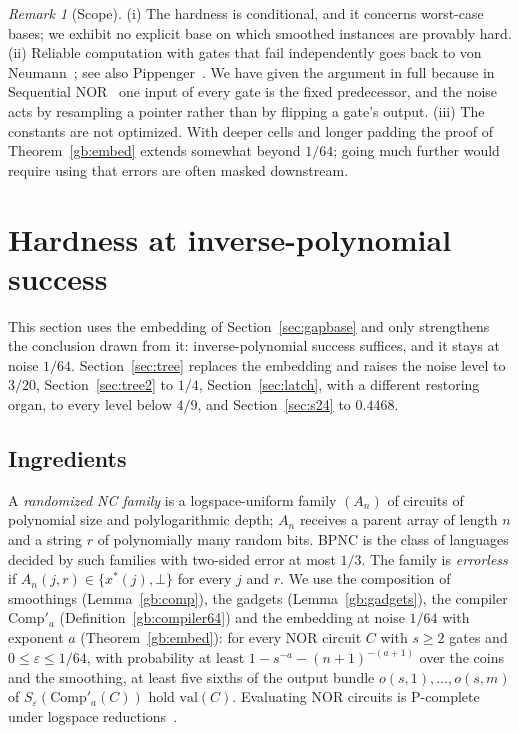 \documentclass[11pt]{amsart}
\theoremstyle{definition}
\theoremstyle{remark}
\newtheorem{remark}[theorem]{Remark}
\newcommand{\eps}{\varepsilon}
\newcommand{\val}{\mathrm{val}}
\newcommand{\Comp}{\mathrm{Comp}}
\begin{document}
\begin{remark}[Scope]\label{gb:rem-scope}
(i) The hardness is conditional, and it concerns worst-case bases; we
exhibit no explicit base on which smoothed instances are provably hard.
(ii) Reliable computation with gates that fail independently goes back to
von Neumann~\cite{gb-vonneumann}; see also Pippenger~\cite{gb-pippenger}.
We have given the argument in full because in Sequential
NOR~\cite{okhotin} one input of every gate is the fixed predecessor, and the
noise acts by resampling a pointer rather than by flipping a gate's output.
(iii) The constants are not optimized. With deeper cells and longer padding
the proof of Theorem~\ref{gb:embed} extends somewhat beyond $1/64$; going
much further would require using that errors are often masked downstream.
\end{remark}

\section{Hardness at inverse-polynomial success}\label{sec:gap}

This section uses the embedding of Section~\ref{sec:gapbase} and only strengthens the conclusion
drawn from it: inverse-polynomial success suffices, and it stays at noise $1/64$. Section~\ref{sec:tree} replaces the embedding and raises the noise level to $3/20$,
Section~\ref{sec:tree2} to $1/4$, Section~\ref{sec:latch}, with a different restoring organ,
to every level below $4/9$, and Section~\ref{sec:s24} to $0.4468$.

\subsection{Ingredients}

A \emph{randomized NC family} is a logspace-uniform family $(A_n)$ of circuits of polynomial size
and polylogarithmic depth; $A_n$ receives a parent array of length $n$ and a string $r$ of
polynomially many random bits. BPNC is the class of languages decided by such families with
two-sided error at most $1/3$. The family is \emph{errorless} if $A_n(j,r)\in\{x^*(j),\bot\}$ for
every $j$ and $r$. We use the composition of smoothings (Lemma~\ref{gb:comp}), the gadgets
(Lemma~\ref{gb:gadgets}), the compiler $\Comp'_a$ (Definition~\ref{gb:compiler64}) and the
embedding at noise $1/64$ with exponent $a$ (Theorem~\ref{gb:embed}): for every NOR circuit $C$
with $s\ge2$ gates and $0\le\eps\le1/64$, with probability at least $1-s^{-a}-(n+1)^{-(a+1)}$ over
the coins and the smoothing, at least five sixths of the output bundle $o(s,1),\dots,o(s,m)$ of
$S_\eps(\Comp'_a(C))$ hold $\val(C)$. Evaluating NOR circuits is P-complete under logspace
reductions~\cite{gb-ladner,ghr}.
\end{document}
